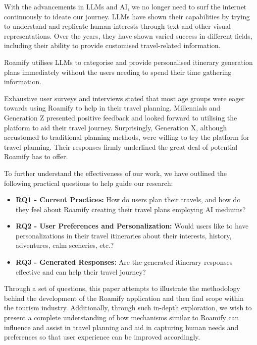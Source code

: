 \documentclass[final,1p,times]{elsarticle}
\begin{document}
    With the advancements in LLMs and AI, we no longer need to surf the internet continuously to ideate our journey. LLMs have shown their capabilities by trying to understand and replicate human interests through text and other visual representations\cite{intro2}. Over the years, they have shown varied success in different fields, including their ability to provide customised travel-related information.
    
    Roamify utilises LLMs to categorise and provide personalised itinerary generation plans immediately without the users needing to spend their time gathering information.
    
    Exhaustive user surveys and interviews stated that most age groups were eager towards using Roamify to help in their travel planning. Millennials and Generation Z presented positive feedback and looked forward to utilising the platform to aid their travel journey. Surprisingly, Generation X, although accustomed to traditional planning methods, were willing to try the platform for travel planning. Their responses firmly underlined the great deal of potential Roamify has to offer.
    
    To further understand the effectiveness of our work, we have outlined the following practical questions to help guide our research:
    
    \begin{itemize}
        \item \textbf{RQ1 - Current Practices:} How do users plan their travels, and how do they feel about Roamify creating their travel plans employing AI mediums?
        \item \textbf{RQ2 - User Preferences and Personalization:} Would users like to have personalizations in their travel itineraries about their interests, history, adventures, calm sceneries, etc.?
        \item \textbf{RQ3 - Generated Responses:} Are the generated itinerary responses effective and can help their travel journey?
        
    \end{itemize}
    
    Through a set of questions, this paper attempts to illustrate the methodology behind the development of the Roamify application and then find scope within the tourism industry. Additionally, through such in-depth exploration, we wish to present a complete understanding of how mechanisms similar to Roamify can influence and assist in travel planning and aid in capturing human needs and preferences so that user experience can be improved accordingly.
\end{document}
